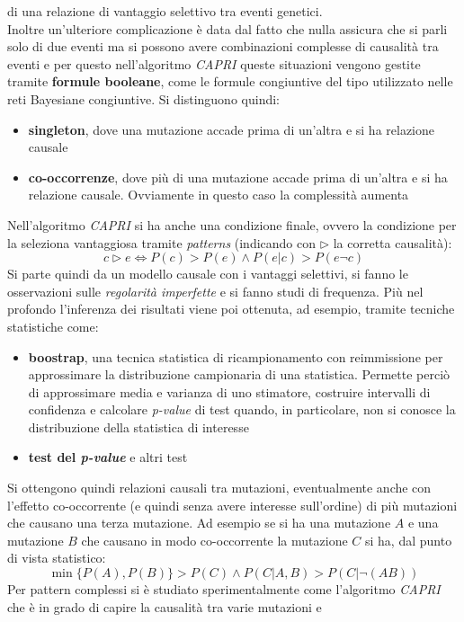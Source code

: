 \documentclass[a4paper,12pt, oneside]{book}
\begin{document}
di una relazione di vantaggio selettivo tra eventi genetici. \\
Inoltre un'ulteriore complicazione è data dal fatto che nulla assicura che si
parli solo di due eventi ma si possono avere combinazioni complesse di causalità
tra eventi e per questo nell'algoritmo \textit{CAPRI} queste situazioni vengono
gestite tramite \textbf{formule booleane}, come le formule congiuntive del tipo
utilizzato nelle reti Bayesiane congiuntive. Si distinguono quindi:
\begin{itemize}
  \item \textbf{singleton}, dove una mutazione accade prima di un'altra e si ha
  relazione causale
  \item \textbf{co-occorrenze}, dove più di una mutazione accade prima di
  un'altra e si ha relazione causale. Ovviamente in questo caso la complessità
  aumenta 
\end{itemize}
Nell'algoritmo \textit{CAPRI} si ha anche una condizione finale, ovvero la
condizione per la seleziona vantaggiosa tramite \textit{patterns} (indicando con
$\triangleright$ la corretta causalità):
\[c\triangleright e\iff P(c)>P(e)\land P(e|c)>P(e\neg c)\]
Si parte quindi da un modello causale con i vantaggi selettivi, si fanno le
osservazioni sulle \textit{regolarità imperfette} e si fanno studi di frequenza. 
Più nel profondo l'inferenza dei risultati viene poi ottenuta, ad esempio,
tramite tecniche statistiche come:
\begin{itemize}
  \item \textbf{boostrap}, una tecnica statistica di ricampionamento con
  reimmissione per approssimare la distribuzione campionaria di una
  statistica. Permette perciò di approssimare media e varianza di uno stimatore,
  costruire intervalli di confidenza e calcolare \textit{p-value} di test
  quando, in particolare, non si conosce la distribuzione della statistica di
  interesse
  \item \textbf{test del \textit{p-value}} e altri test
\end{itemize}
Si ottengono quindi relazioni causali tra mutazioni, eventualmente anche con
l'effetto co-occorrente (e quindi senza avere interesse sull'ordine) di più
mutazioni che causano una terza mutazione. Ad esempio se si ha una mutazione $A$
e una mutazione $B$ che causano in modo co-occorrente la mutazione $C$ si ha, dal
punto di vista statistico:
\[\min\{P(A),P(B)\}>P(C)\land P(C|A,B)>P(C|\neg(AB))\]
Per pattern complessi si è studiato sperimentalmente come l'algoritmo
\textit{CAPRI} che è in grado di capire la causalità tra varie mutazioni e
\end{document}
